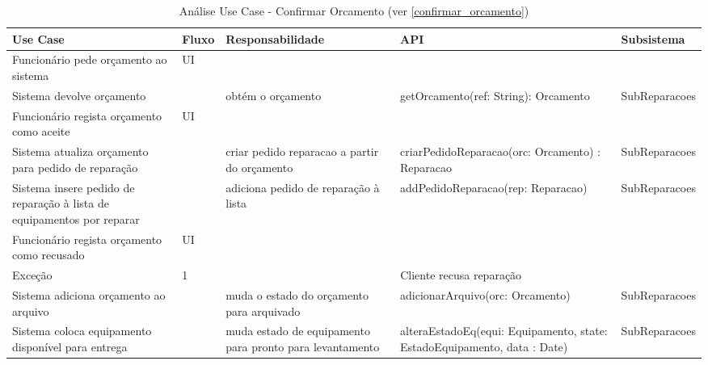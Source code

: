 \documentclass[../relatorio.tex]{subfiles}
\begin{document}
\begin{landscape}
    \begin{table}[!h]
        \centering
        \begin{tabular}{|p{5cm}|p{1cm}|p{4cm}|p{6cm}|p{3cm}|}
            \hline
            \rowcolor{gray!20!white}
            Use Case & Fluxo                                            & Responsabilidade & API & Subsistema \\
            \hline
            \rowcolor{yellow}
            Funcionário pede orçamento ao sistema
                     & UI
                     & 
                     & 
                     & 
            \\
            \hline
            Sistema devolve orçamento
                     & 
                     & obtém o orçamento
                     & getOrcamento(ref: String): Orcamento
                     & SubReparacoes
            \\
            \hline
            \rowcolor{yellow}
            Funcionário regista orçamento como aceite
                     & UI
                     & 
                     & 
                     & 
            \\
            \hline
            Sistema atualiza orçamento para pedido de reparação
                     & 
                     & criar pedido reparacao a partir do orçamento
                     & criarPedidoReparacao(orc: Orcamento) : Reparacao
                     & SubReparacoes
            \\
            \hline
            Sistema insere pedido de reparação à lista de equipamentos por reparar
                     & 
                     & adiciona pedido de reparação à lista
                     & addPedidoReparacao(rep: Reparacao)
                     & SubReparacoes
            \\
            \hline
            \rowcolor{yellow}
            Funcionário regista orçamento como recusado
                     & UI
                     & 
                     & 
                     & 
            \\
            \hline
            \rowcolor{red!30}
            Exceção  & 1                                                 &  \multicolumn{3}{c}{Cliente recusa reparação}\\
            \hline
            Sistema adiciona orçamento ao arquivo
                     & 
                     & muda o estado do orçamento para arquivado
                     & adicionarArquivo(orc: Orcamento)
                     & SubReparacoes
            \\
            \hline
            Sistema coloca equipamento disponível para entrega
                     & 
                     & muda estado de equipamento para pronto para levantamento
                     & alteraEstadoEq(equi: Equipamento, state: EstadoEquipamento, data : Date)
                     & SubReparacoes
            \\
            \hline
        \end{tabular}
        \caption{Análise Use Case - Confirmar Orcamento (ver \ref{confirmar_orcamento})}
    \end{table}
\end{landscape}
\end{document}
